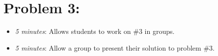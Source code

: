 \documentclass[handout,nooutcomes]{ximera}
\begin{document}
\section*{Problem 3:}

	\begin{itemize}
	
	\item \emph{5 minutes}:  Allows students to work on \#3 in groups. 
	
	\item \emph{5 minutes}:  Allow a group to present their solution to problem \#3.
	
	\end{itemize}	
	
	
	
	
	

	
	
	

	
	
	
\end{document}
